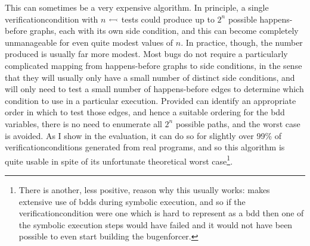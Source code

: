 
This can sometimes be a very expensive algorithm.  In principle, a
single \gls{verificationcondition} with $n$ $\leftarrowtail$ tests
could produce up to $2^n$ possible happens-before graphs, each with
its own side condition, and this can become completely unmanageable
for even quite modest values of $n$.  In practice, though, the number
produced is usually far more modest.  Most bugs do not require a
particularly complicated mapping from happens-before graphs to side
conditions, in the sense that they will usually only have a small
number of distinct side conditions, and will only need to test a small
number of happens-before edges to determine which condition to use in
a particular execution.  Provided {\implementation} can identify an
appropriate order in which to test those edges, and hence a suitable
ordering for the \gls{bdd} variables, there is no need to enumerate
all $2^n$ possible paths, and the worst case is avoided.  As I show in
the evaluation, it can do so for slightly over 99\% of
\glspl{verificationcondition} generated from real programs, and so
this algorithm is quite usable in spite of its unfortunate theoretical
worst case\footnote{There is another, less positive, reason why this
  usually works: {\implementation} makes extensive use of
  \protect\glspl{bdd} during symbolic execution, and so if the
  \protect\gls{verificationcondition} were one which is hard to
  represent as a \protect\gls{bdd} then one of the symbolic execution
  steps would have failed and it would not have been possible to even
  start building the \protect\gls{bugenforcer}.}.

